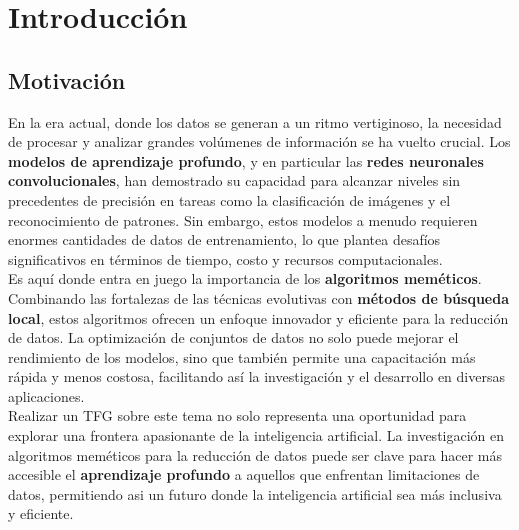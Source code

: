 \chapter{Introducción}\label{ch:introduccion}

\section{Motivación}\label{sec:motivation}
En la era actual, donde los datos se generan a un ritmo vertiginoso, la necesidad de procesar y analizar grandes
volúmenes de información se ha vuelto crucial.
Los \textbf{modelos de aprendizaje profundo}, y en particular las \textbf{redes neuronales convolucionales}, han
demostrado su capacidad para alcanzar niveles sin precedentes de precisión en tareas como la clasificación de imágenes
y el reconocimiento de patrones.
Sin embargo, estos modelos a menudo requieren enormes cantidades de datos de entrenamiento, lo que plantea desafíos
significativos en términos de tiempo, costo y recursos computacionales.\\[6pt]

Es aquí donde entra en juego la importancia de los \textbf{algoritmos meméticos}.
Combinando las fortalezas de las técnicas evolutivas con \textbf{métodos de búsqueda local}, estos algoritmos ofrecen
un enfoque innovador y eficiente para la reducción de datos.
La optimización de conjuntos de datos no solo puede mejorar el rendimiento de los modelos, sino que también permite una
capacitación más rápida y menos costosa, facilitando así la investigación y el desarrollo en diversas aplicaciones.
\\[6pt]

Realizar un TFG sobre este tema no solo representa una oportunidad para explorar una frontera apasionante de la
inteligencia artificial.
La investigación en algoritmos meméticos para la reducción de datos puede ser clave para hacer más accesible el
\textbf{aprendizaje profundo} a aquellos que enfrentan limitaciones de datos, permitiendo asi un futuro donde la
inteligencia artificial sea más inclusiva y eficiente.\\[6pt]


